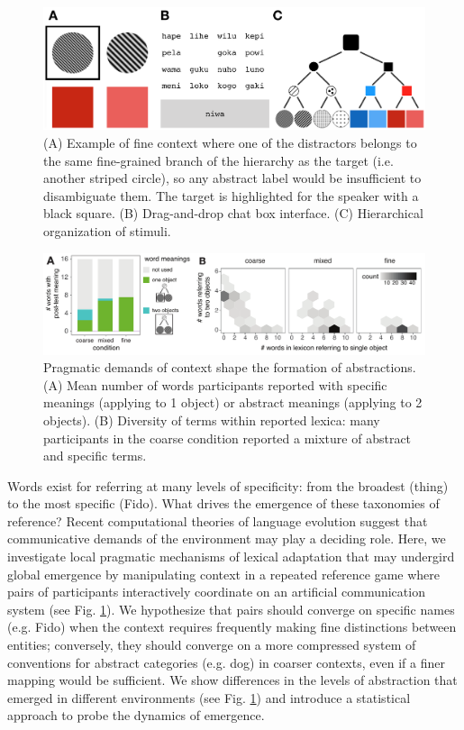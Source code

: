 \documentclass[12pt, donotrepeattitle, man, floatsintext]{apa6}
\begin{document}
\begin{figure}[b]
\centering
\includegraphics[scale=.5]{fig.png}
\caption{(A) Example of fine context where one of the distractors belongs to the same fine-grained branch of the hierarchy as the target (i.e. another striped circle), so any abstract label would be insufficient to disambiguate them. The target is highlighted for the speaker with a black square. (B) Drag-and-drop chat box interface. (C) Hierarchical organization of stimuli.}
\label{fig:2018task}
\end{figure}

\begin{figure}[t]
\centering
\includegraphics[scale=.7]{resultsFig_v1.pdf}
\caption{ Pragmatic demands of context shape the formation of abstractions. (A) Mean number of words participants reported
with specific meanings (applying to 1 object) or abstract meanings (applying to 2 objects). (B) Diversity of terms within
reported lexica: many participants in the coarse condition reported a mixture of abstract and specific terms.}
\label{fig:modelresults}
\end{figure}

Words exist for referring at many levels of specificity: from the broadest (thing) to the most specific (Fido). What drives the emergence of these taxonomies of reference? Recent computational theories of language evolution suggest that communicative demands of the environment may play a deciding role. Here, we investigate local pragmatic mechanisms of lexical adaptation that may undergird global emergence by manipulating context in a repeated reference game where pairs of participants interactively coordinate on an artificial communication system (see Fig. \ref{fig:2018task}). We hypothesize that pairs should converge on specific names (e.g. Fido) when the context requires frequently making fine distinctions between entities; conversely, they should converge on a more compressed system of conventions for abstract categories (e.g. dog) in coarser contexts, even if a finer mapping would be sufficient. We show differences in the levels of abstraction that emerged in different environments (see Fig. \ref{fig:2018task}) and introduce a statistical approach to probe the dynamics of emergence. 
\end{document}
